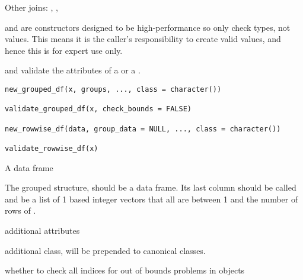 \documentclass[a4paper]{book}
\begin{document}
%
\begin{SeeAlso}
Other joins: 
,
,
\end{SeeAlso}
%
\begin{Examples}
\end{Examples}
%
\begin{Description}
 and  are constructors designed to be high-performance so only
check types, not values. This means it is the caller's responsibility
to create valid values, and hence this is for expert use only.

 and  validate the attributes
of a  or a .
\end{Description}
%
\begin{Usage}
\begin{verbatim}
new_grouped_df(x, groups, ..., class = character())

validate_grouped_df(x, check_bounds = FALSE)

new_rowwise_df(data, group_data = NULL, ..., class = character())

validate_rowwise_df(x)
\end{verbatim}
\end{Usage}
%
\begin{Arguments}
\begin{ldescription}
\item[\code{x}] A data frame

\item[\code{groups}] The grouped structure,  should be a data frame.
Its last column should be called  and be
a list of 1 based integer vectors that all are between 1 and the number of rows of .

\item[\code{...}] additional attributes

\item[\code{class}] additional class, will be prepended to canonical classes.

\item[\code{check\_bounds}] whether to check all indices for out of bounds problems in  objects
\end{ldescription}
\end{Arguments}
\end{document}

